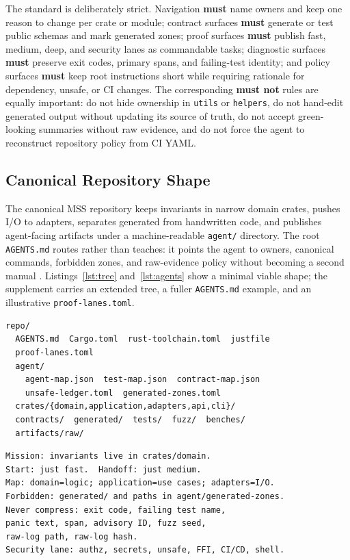 \documentclass[conference]{IEEEtran}
\newcommand{\mss}{\textnormal{\textsc{MSS}}}
\begin{document}
The standard is deliberately strict. Navigation \textbf{must} name owners and keep one reason to change per crate or module; contract surfaces \textbf{must} generate or test public schemas and mark generated zones; proof surfaces \textbf{must} publish fast, medium, deep, and security lanes as commandable tasks; diagnostic surfaces \textbf{must} preserve exit codes, primary spans, and failing-test identity; and policy surfaces \textbf{must} keep root instructions short while requiring rationale for dependency, unsafe, or CI changes. The corresponding \textbf{must not} rules are equally important: do not hide ownership in \texttt{utils} or \texttt{helpers}, do not hand-edit generated output without updating its source of truth, do not accept green-looking summaries without raw evidence, and do not force the agent to reconstruct repository policy from CI YAML.

\subsection{Canonical Repository Shape}
The canonical \mss{} repository keeps invariants in narrow domain crates, pushes I/O to adapters, separates generated from handwritten code, and publishes agent-facing artifacts under a machine-readable \texttt{agent/} directory. The root \texttt{AGENTS.md} routes rather than teaches: it points the agent to owners, canonical commands, forbidden zones, and raw-evidence policy without becoming a second manual \cite{agentsMdEval2026,onImpactAgents2026,openaiAgents2026,anthropicMemory2026}. Listings~\ref{lst:tree} and~\ref{lst:agents} show a minimal viable shape; the supplement carries an extended tree, a fuller \texttt{AGENTS.md} example, and an illustrative \texttt{proof-lanes.toml}.

\begin{lstlisting}[style=treecode,caption={Canonical \mss{} workspace tree (compact)},label={lst:tree}]
repo/
  AGENTS.md  Cargo.toml  rust-toolchain.toml  justfile
  proof-lanes.toml
  agent/
    agent-map.json  test-map.json  contract-map.json
    unsafe-ledger.toml  generated-zones.toml
  crates/{domain,application,adapters,api,cli}/
  contracts/  generated/  tests/  fuzz/  benches/
  artifacts/raw/
\end{lstlisting}

\begin{lstlisting}[style=plaincode,caption={Canonical root \texttt{AGENTS.md} (excerpt)},label={lst:agents}]
Mission: invariants live in crates/domain.
Start: just fast.  Handoff: just medium.
Map: domain=logic; application=use cases; adapters=I/O.
Forbidden: generated/ and paths in agent/generated-zones.
Never compress: exit code, failing test name,
panic text, span, advisory ID, fuzz seed,
raw-log path, raw-log hash.
Security lane: authz, secrets, unsafe, FFI, CI/CD, shell.
\end{lstlisting}
\end{document}
